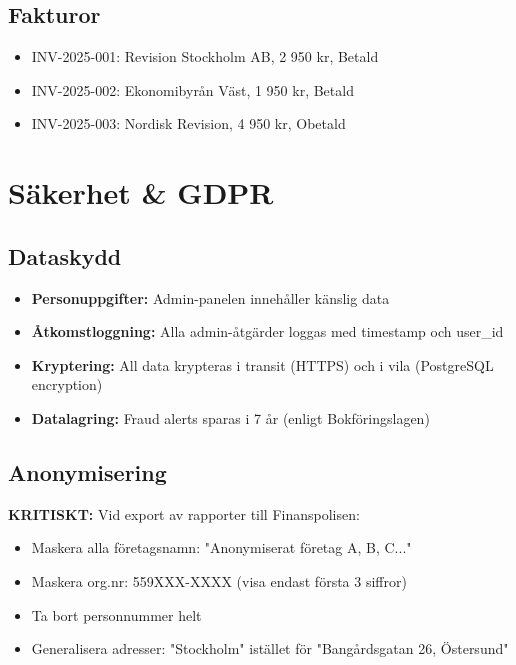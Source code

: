 \documentclass[12pt,a4paper]{article}
\begin{document}
\subsection{Fakturor}
\begin{itemize}
  \item INV-2025-001: Revision Stockholm AB, 2 950 kr, Betald
  \item INV-2025-002: Ekonomibyrån Väst, 1 950 kr, Betald
  \item INV-2025-003: Nordisk Revision, 4 950 kr, Obetald
\end{itemize}

\section{Säkerhet \& GDPR}

\subsection{Dataskydd}
\begin{itemize}
  \item \textbf{Personuppgifter:} Admin-panelen innehåller känslig data
  \item \textbf{Åtkomstloggning:} Alla admin-åtgärder loggas med timestamp och user\_id
  \item \textbf{Kryptering:} All data krypteras i transit (HTTPS) och i vila (PostgreSQL encryption)
  \item \textbf{Datalagring:} Fraud alerts sparas i 7 år (enligt Bokföringslagen)
\end{itemize}

\subsection{Anonymisering}
\textbf{KRITISKT:} Vid export av rapporter till Finanspolisen:
\begin{itemize}
  \item Maskera alla företagsnamn: "Anonymiserat företag A, B, C..."
  \item Maskera org.nr: 559XXX-XXXX (visa endast första 3 siffror)
  \item Ta bort personnummer helt
  \item Generalisera adresser: "Stockholm" istället för "Bangårdsgatan 26, Östersund"
\end{itemize}
\end{document}
